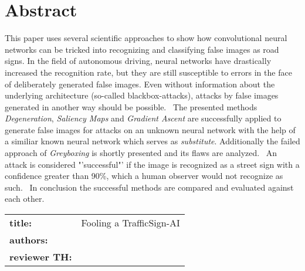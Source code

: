 \chapter*{Abstract} %
This paper uses several scientific approaches to show how convolutional neural networks can be tricked into recognizing and classifying false images as road signs.
In the field of autonomous driving, neural networks have drastically increased the recognition rate, but they are still susceptible to errors in the face of deliberately generated false images. Even without information about the underlying architecture (so-called blackbox-attacks), attacks by false images generated in another way should be possible.
~\newline The presented methods \textit{Degeneration}, \textit{Saliency Maps} and \textit{Gradient Ascent} are successfully applied to generate false images for attacks on an unknown neural network with the help of a similiar known neural network which serves as \textit{substitute}. Additionally the failed approach of \textit{Greyboxing} is shortly presented and its flaws are analyzed.
~\newline An attack is considered "'successful"' if the image is recognized as a street sign with a confidence greater than 90\%, which a human observer would not recognize as such.
~\newline In conclusion the successful methods are compared and evaluated against each other.  
~\newline
~\newline
\begin{flushleft}
	\begin{tabular}{lp{11cm}}
		\textbf{title:} & Fooling a TrafficSign-AI \\
		\textbf{authors:}  & \autor \\
		
		\textbf{reviewer TH:} & \betreuerth \\
		[6ex]%
	\end{tabular} 
\end{flushleft}



